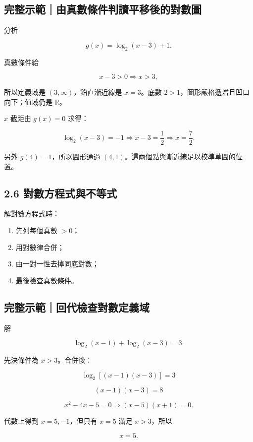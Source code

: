 \documentclass[11pt,a4paper]{article}
\providecommand{\tightlist}{%
  \setlength{\itemsep}{0pt}\setlength{\parskip}{0pt}}
\begin{document}
\begin{HandoutWorkedExample}

\subsection{完整示範｜由真數條件判讀平移後的對數圖}\label{ux5b8cux6574ux793aux7bc4ux7531ux771fux6578ux689dux4ef6ux5224ux8b80ux5e73ux79fbux5f8cux7684ux5c0dux6578ux5716}

分析

\[
g(x)=\log_2(x-3)+1.
\]

真數條件給

\[
x-3>0\Longrightarrow x>3,
\]

所以定義域是 \((3,\infty)\)，鉛直漸近線是 \(x=3\)。底數 \(2>1\)，圖形嚴格遞增且凹口向下；值域仍是 \(\mathbb R\)。

\(x\) 截距由 \(g(x)=0\) 求得：

\[
\log_2(x-3)=-1
\Longrightarrow x-3=\frac12
\Longrightarrow
\boxed{x=\frac72}.
\]

另外 \(g(4)=1\)，所以圖形通過 \((4,1)\)。這兩個點與漸近線足以校準草圖的位置。

\end{HandoutWorkedExample}

\subsection{2.6 對數方程式與不等式}\label{ux5c0dux6578ux65b9ux7a0bux5f0fux8207ux4e0dux7b49ux5f0f}

解對數方程式時：

\begin{enumerate}
\def\labelenumi{\arabic{enumi}.}
\tightlist
\item
  先列每個真數 \(>0\)；
\item
  用對數律合併；
\item
  由一對一性去掉同底對數；
\item
  最後檢查真數條件。
\end{enumerate}

\begin{HandoutWorkedExample}

\subsection{完整示範｜回代檢查對數定義域}\label{ux5b8cux6574ux793aux7bc4ux56deux4ee3ux6aa2ux67e5ux5c0dux6578ux5b9aux7fa9ux57df}

解

\[
\log_2(x-1)+\log_2(x-3)=3.
\]

先決條件為 \(x>3\)。合併後：

\[
\log_2[(x-1)(x-3)]=3
\]

\[
(x-1)(x-3)=8
\]

\[
x^2-4x-5=0
\Rightarrow (x-5)(x+1)=0.
\]

代數上得到 \(x=5,-1\)，但只有 \(x=5\) 滿足 \(x>3\)，所以

\[
\boxed{x=5}.
\]

\end{HandoutWorkedExample}
\end{document}
